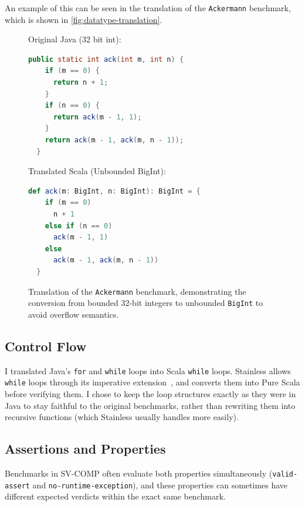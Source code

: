\documentclass[11pt,titlepage,openright]{book}
\begin{document}
An example of this can be seen in the translation of the \texttt{Ackermann}
benchmark, which is shown in \autoref{fig:datatype-translation}.

\begin{figure}[htbp]
\begin{minipage}[t]{0.48\textwidth}
Original Java (32 bit int):
\begin{lstlisting}[language=Java, basicstyle=\ttfamily\scriptsize]
public static int ack(int m, int n) {
    if (m == 0) {
      return n + 1;
    }
    if (n == 0) {
      return ack(m - 1, 1);
    }
    return ack(m - 1, ack(m, n - 1));
  }
\end{lstlisting}
\end{minipage}
\hfill
\begin{minipage}[t]{0.48\textwidth}
Translated Scala (Unbounded BigInt):
\begin{lstlisting}[language=Scala, basicstyle=\ttfamily\scriptsize]
def ack(m: BigInt, n: BigInt): BigInt = {
    if (m == 0)
      n + 1
    else if (n == 0)
      ack(m - 1, 1)
    else
      ack(m - 1, ack(m, n - 1))
  }
\end{lstlisting}
\end{minipage}
\caption{Translation of the \texttt{Ackermann} benchmark, demonstrating the conversion from bounded 32-bit integers to unbounded \texttt{BigInt} to avoid overflow semantics.}
\label{fig:datatype-translation}
\end{figure}


\subsection{Control Flow}
\label{sec:translation-control}

I translated Java's \texttt{for} and \texttt{while} loops into Scala
\texttt{while} loops. Stainless allows \texttt{while} loops through its imperative
extension~\cite{StainlessImperative}, and converts them into Pure Scala before
verifying them. I chose to keep the loop structures exactly as they were in Java
to stay faithful to the original benchmarks, rather than rewriting them into
recursive functions (which Stainless usually handles more easily).

 
\subsection{Assertions and Properties}
\label{sec:translation-assertions}
 
Benchmarks in SV-COMP often evaluate both properties simultaneously 
(\texttt{valid-assert} and \texttt{no-runtime-exception}), 
and these properties can sometimes have different expected verdicts 
within the exact same benchmark. 
\end{document}
